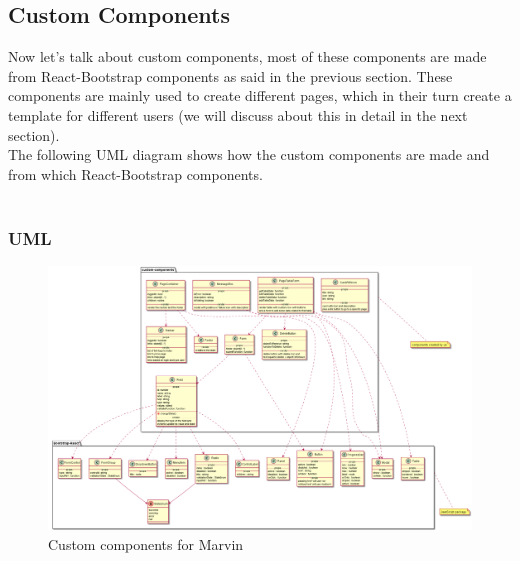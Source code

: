 	\subsection{Custom Components} Now let's talk about custom components, most of these components are made from React-Bootstrap components as said in the previous section. These components are mainly used to create different pages, which in their turn create a template for different users (we will discuss about this in detail in the next section). \\The following UML diagram shows how the custom components are made and from which React-Bootstrap components.  
	\\ \\
		\subsubsection{UML}
			\begin{figure}[h]
			\centering
			\includegraphics[width=1\linewidth]{"diagrammi/customComponents"}
			\caption{Custom components for Marvin}
			\label{fig:Custom components for Marvin}
		\end{figure}